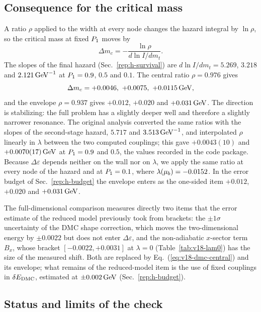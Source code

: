 \subsection{Consequence for the critical mass}\label{sec:v18-mc}

A ratio $\rho$ applied to the width at every node changes the hazard integral by $\ln\rho$, so the critical mass at fixed $P_1$ moves by
\begin{equation}
\Delta m_c=-\frac{\ln\rho}{d\ln I/dm_t}.
\label{eq:v18-dmc}
\end{equation}
The slopes of the final hazard (Sec.~\ref{rep:h-survival}) are $d\ln I/dm_t=5.269$, $3.218$ and $2.121\,\mathrm{GeV}^{-1}$ at $P_1=0.9$, $0.5$ and $0.1$. %
The central ratio $\rho=0.976$ gives
\begin{equation}
\Delta m_c=+0.0046,\ +0.0075,\ +0.0115\GeV,
\label{eq:v18-dmc-central}
\end{equation}
and the envelope $\rho=0.937$ gives $+0.012$, $+0.020$ and $+0.031\,\mathrm{GeV}$. %
The direction is stabilizing: the full problem has a slightly deeper well and therefore a slightly narrower resonance.
The original analysis converted the same ratios with the slopes of the second-stage hazard, $5.717$ and $3.513\,\mathrm{GeV}^{-1}$, and interpolated $\rho$ linearly in $\lambda$ between the two computed couplings; this gave $+0.0043(10)$ and $+0.0070(17)\,\mathrm{GeV}$ at $P_1=0.9$ and $0.5$, the values recorded in the code package. %
Because $\Delta\varepsilon$ depends neither on the wall nor on $\lambda$, we apply the same ratio at every node of the hazard and at $P_1=0.1$, where $\lambda(\mu_b)=-0.0152$. %
In the error budget of Sec.~\ref{rep:h-budget} the envelope enters as the one-sided item $+0.012$, $+0.020$ and $+0.031\,\mathrm{GeV}$. %

The full-dimensional comparison measures directly two items that the error estimate of the reduced model previously took from brackets: the $\pm1\sigma$ uncertainty of the DMC shape correction, which moves the two-dimensional energy by $\pm0.0022$ but does not enter $\Delta\varepsilon$, and the non-adiabatic $x$-sector term $B_x$, whose bracket $[-0.0022,+0.0031]$ at $\lambda=0$ (Table~\ref{tab:v18-lam0}) has the size of the measured shift.
Both are replaced by Eq.~(\ref{eq:v18-dmc-central}) and its envelope; what remains of the reduced-model item is the use of fixed couplings in $\delta E_{\rm DMC}$, estimated at $\pm0.002\,\mathrm{GeV}$ (Sec.~\ref{rep:h-budget}). %

\subsection{Status and limits of the check}\label{sec:v18-status}

